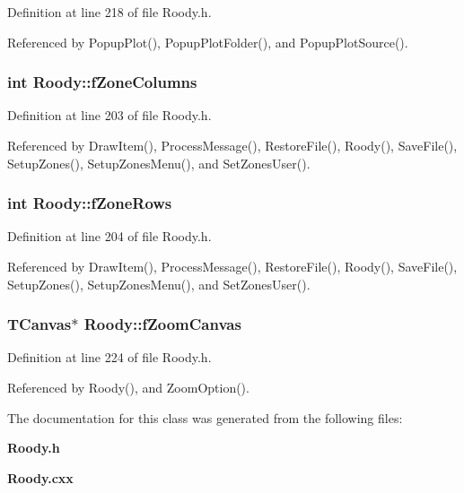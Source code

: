 Definition at line 218 of file Roody.h.



Referenced by PopupPlot(), PopupPlotFolder(), and PopupPlotSource().

\subsubsection[{fZoneColumns}]{\setlength{\rightskip}{0pt plus 5cm}int {\bf Roody::fZoneColumns}\hspace{0.3cm}{\ttfamily  [private]}}\label{classRoody_aa62435ee7709fcb4d9954a5873c09915}


Definition at line 203 of file Roody.h.



Referenced by DrawItem(), ProcessMessage(), RestoreFile(), Roody(), SaveFile(), SetupZones(), SetupZonesMenu(), and SetZonesUser().

\subsubsection[{fZoneRows}]{\setlength{\rightskip}{0pt plus 5cm}int {\bf Roody::fZoneRows}\hspace{0.3cm}{\ttfamily  [private]}}\label{classRoody_a04bbe3023ac4bdaf56817e0d21a8db09}


Definition at line 204 of file Roody.h.



Referenced by DrawItem(), ProcessMessage(), RestoreFile(), Roody(), SaveFile(), SetupZones(), SetupZonesMenu(), and SetZonesUser().

\subsubsection[{fZoomCanvas}]{\setlength{\rightskip}{0pt plus 5cm}TCanvas$\ast$ {\bf Roody::fZoomCanvas}\hspace{0.3cm}{\ttfamily  [private]}}\label{classRoody_ad666d0f7042bcf625f8538546b2f4cb9}


Definition at line 224 of file Roody.h.



Referenced by Roody(), and ZoomOption().



The documentation for this class was generated from the following files:\begin{DoxyCompactItemize}
\item 
{\bf Roody.h}\item 
{\bf Roody.cxx}\end{DoxyCompactItemize}
